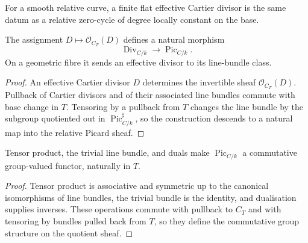 For a smooth relative curve, a finite flat effective Cartier divisor is the
same datum as a relative zero-cycle of degree locally constant on the base.

\begin{proposition}
  \label{mk-prop-abel-map}
  \cite[Thm.~3.7]{kleiman-picard}
  The assignment \(D\mapsto\mathcal O_{C_T}(D)\) defines a natural morphism
  \[
    \operatorname{Div}_{C/k}\longrightarrow\operatorname{Pic}_{C/k}.
  \]
  On a geometric fibre it sends an effective divisor to its line-bundle class.
\end{proposition}

\begin{proof}
  An effective Cartier divisor \(D\) determines the invertible sheaf
  \(\mathcal O_{C_T}(D)\).  Pullback of Cartier divisors and of their
  associated line bundles commute with base change in \(T\).  Tensoring by a
  pullback from \(T\) changes the line bundle by the subgroup quotiented out
  in \(\operatorname{Pic}^{\sharp}_{C/k}\), so the construction descends to
  a natural map into the relative Picard sheaf.
\end{proof}

\begin{proposition}
  \label{mk-prop-picard-group}
  \cite{kleiman-picard}
  Tensor product, the trivial line bundle, and duals make
  \(\operatorname{Pic}_{C/k}\) a commutative group-valued functor, naturally
  in \(T\).
\end{proposition}

\begin{proof}
  Tensor product is associative and symmetric up to the canonical
  isomorphisms of line bundles, the trivial bundle is the identity, and
  dualisation supplies inverses.  These operations commute with pullback to
  \(C_T\) and with tensoring by bundles pulled back from \(T\), so they define
  the commutative group structure on the quotient sheaf.
\end{proof}
